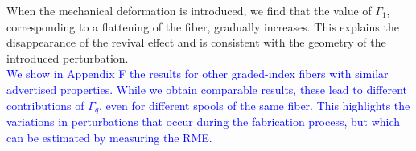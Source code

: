 \documentclass[aps,prl,twocolumn, amsmath,amssymb,superscriptaddress]{revtex4-2}
\newcommand{\red}[1]{\textcolor{red}{#1}}
\newcommand{\blue}[1]{\textcolor{blue}{#1}}
\begin{document}
When the mechanical deformation is introduced,
we find that the value of \(\Gamma_1\),
corresponding to a flattening of the fiber,
gradually increases.
This explains the disappearance of the revival effect
and is consistent with the geometry of the introduced perturbation.\\

\blue{
We show in Appendix F the results for other graded-index fibers 
with similar advertised properties. 
While we obtain comparable results, 
these lead to different contributions of $\Gamma_q$, 
even for different spools of the same fiber. 
This highlights the variations in perturbations 
that occur during the fabrication process, 
but which can be estimated by measuring the RME.
}






\end{document}
